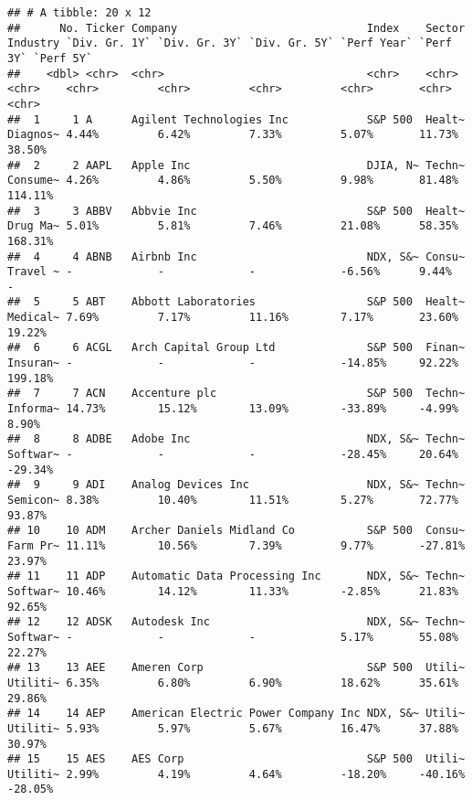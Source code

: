 \documentclass[
]{article}
\begin{document}
\begin{verbatim}
## # A tibble: 20 x 12
##      No. Ticker Company                             Index    Sector Industry `Div. Gr. 1Y` `Div. Gr. 3Y` `Div. Gr. 5Y` `Perf Year` `Perf 3Y` `Perf 5Y`
##    <dbl> <chr>  <chr>                               <chr>    <chr>  <chr>    <chr>         <chr>         <chr>         <chr>       <chr>     <chr>    
##  1     1 A      Agilent Technologies Inc            S&P 500  Healt~ Diagnos~ 4.44%         6.42%         7.33%         5.07%       11.73%    38.50%   
##  2     2 AAPL   Apple Inc                           DJIA, N~ Techn~ Consume~ 4.26%         4.86%         5.50%         9.98%       81.48%    114.11%  
##  3     3 ABBV   Abbvie Inc                          S&P 500  Healt~ Drug Ma~ 5.01%         5.81%         7.46%         21.08%      58.35%    168.31%  
##  4     4 ABNB   Airbnb Inc                          NDX, S&~ Consu~ Travel ~ -             -             -             -6.56%      9.44%     -        
##  5     5 ABT    Abbott Laboratories                 S&P 500  Healt~ Medical~ 7.69%         7.17%         11.16%        7.17%       23.60%    19.22%   
##  6     6 ACGL   Arch Capital Group Ltd              S&P 500  Finan~ Insuran~ -             -             -             -14.85%     92.22%    199.18%  
##  7     7 ACN    Accenture plc                       S&P 500  Techn~ Informa~ 14.73%        15.12%        13.09%        -33.89%     -4.99%    8.90%    
##  8     8 ADBE   Adobe Inc                           NDX, S&~ Techn~ Softwar~ -             -             -             -28.45%     20.64%    -29.34%  
##  9     9 ADI    Analog Devices Inc                  NDX, S&~ Techn~ Semicon~ 8.38%         10.40%        11.51%        5.27%       72.77%    93.87%   
## 10    10 ADM    Archer Daniels Midland Co           S&P 500  Consu~ Farm Pr~ 11.11%        10.56%        7.39%         9.77%       -27.81%   23.97%   
## 11    11 ADP    Automatic Data Processing Inc       NDX, S&~ Techn~ Softwar~ 10.46%        14.12%        11.33%        -2.85%      21.83%    92.65%   
## 12    12 ADSK   Autodesk Inc                        NDX, S&~ Techn~ Softwar~ -             -             -             5.17%       55.08%    22.27%   
## 13    13 AEE    Ameren Corp                         S&P 500  Utili~ Utiliti~ 6.35%         6.80%         6.90%         18.62%      35.61%    29.86%   
## 14    14 AEP    American Electric Power Company Inc NDX, S&~ Utili~ Utiliti~ 5.93%         5.97%         5.67%         16.47%      37.88%    30.97%   
## 15    15 AES    AES Corp                            S&P 500  Utili~ Utiliti~ 2.99%         4.19%         4.64%         -18.20%     -40.16%   -28.05%  

\end{verbatim}
\end{document}
